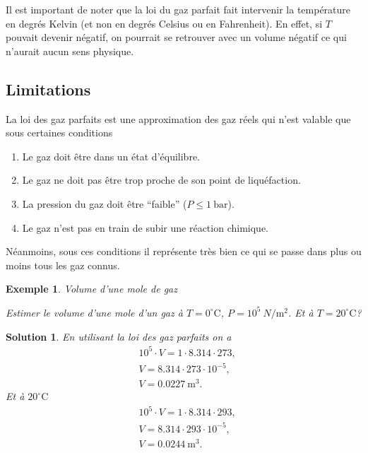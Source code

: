 \documentclass[a4paper,12pt]{book}
\newtheorem*{exemple}{Exemple}
\newtheorem*{solution}{Solution}
\newcommand{\m}{\mathrm{m}}
\newcommand{\C}{\mathrm{C}}
\renewcommand{\bar}{\mathrm{bar}}
\begin{document}
Il est important de noter que la loi du gaz parfait fait intervenir la température en degrés Kelvin (et non en degrés Celsius ou en Fahrenheit). En effet, si $T$ pouvait devenir négatif, on pourrait se retrouver avec un volume négatif ce qui
n'aurait aucun sens physique.

\subsection{Limitations}

La loi des gaz parfaits est une approximation des gaz réels qui n'est valable que 
sous certaines conditions
\begin{enumerate}
\item Le gaz doit être dans un état d'équilibre.
\item Le gaz ne doit pas être trop proche de son point de liquéfaction.
\item La pression du gaz doit être ``faible'' ($P\leq 1\ \bar$).
\item Le gaz n'est pas en train de subir une réaction chimique.
\end{enumerate}
Néanmoins, sous ces conditions il représente très bien ce qui se passe dans plus ou moins tous les gaz connus.

\begin{exemple}{Volume d'une mole de gaz}

Estimer le volume d'une mole d'un gaz à $T=0^\circ\C$, $P=10^5\ N/\m^2$. Et à $T=20^\circ\C$?
\end{exemple}
\begin{solution}
En utilisant la loi des gaz parfaits on a
\begin{align*}
&10^5\cdot V=1\cdot 8.314\cdot 273,\\
&V=8.314\cdot 273\cdot 10^{-5},\\
&V=0.0227\ \m^3.
\end{align*}
Et à $20^\circ\C$
\begin{align*}
&10^5\cdot V=1\cdot 8.314\cdot 293,\\
&V=8.314\cdot 293\cdot 10^{-5},\\
&V=0.0244\ \m^3.
\end{align*}
\end{solution}
\end{document}
